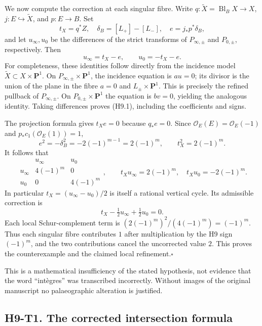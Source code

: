 \documentclass[11pt,a4paper]{article}
\begin{document}
We now compute the correction at each singular fibre. Write
$q:\widetilde X=\operatorname{Bl}_{B}X\to X$,
$j:E\hookrightarrow\widetilde X$, and $p:E\to B$. Set
\[
 t_X=q^*Z,\quad \delta_B=[L_+]-[L_-],\quad
 e=j_*p^*\delta_B,
\]
and let $u_\infty,u_0$ be the differences of the strict transforms of
$P_{\infty,\pm}$ and $P_{0,\pm}$, respectively. Then
\[
 u_\infty=t_X-e,\qquad u_0=-t_X-e.                 \tag{H9.1}
\]
For completeness, these identities follow directly from the incidence
model $\widetilde X\subset X\times\mathbf P^1$. On
$P_{\infty,\pm}\times\mathbf P^1$, the incidence equation is $a u=0$;
its divisor is the union of the plane in the fibre $a=0$ and
$L_\pm\times\mathbf P^1$. This is precisely the refined pullback of
$P_{\infty,\pm}$. On $P_{0,\pm}\times\mathbf P^1$ the equation is
$b v=0$, yielding the analogous identity. Taking differences proves
(H9.1), including the coefficients and signs.

The projection formula gives $t_X e=0$ because $q_*e=0$. Since
$\mathcal O_E(E)=\mathcal O_E(-1)$ and $p_*c_1(\mathcal O_E(1))=1$,
\[
 e^2=-\delta_B^2=-2(-1)^{m-1}=2(-1)^m,
 \qquad t_X^2=2(-1)^m.
\]
It follows that
\[
 \begin{array}{c|cc}
  &u_\infty&u_0\\\hline
 u_\infty&4(-1)^m&0\\
 u_0&0&4(-1)^m
 \end{array},\qquad
 t_Xu_\infty=2(-1)^m,\quad t_Xu_0=-2(-1)^m.
                                                        \tag{H9.2}
\]
In particular $t_X=(u_\infty-u_0)/2$ is itself a rational vertical cycle.
Its admissible correction is
\[
 t_X-\tfrac12u_\infty+\tfrac12u_0=0.
\]
Each local Schur-complement term is
$(2(-1)^m)^2/(4(-1)^m)=(-1)^m$. Thus each singular fibre contributes $1$
after multiplication by the H9 sign $(-1)^m$, and the two contributions
cancel the uncorrected value $2$. This proves the counterexample and the
claimed local refinement.\hfill$\square$

This is a mathematical insufficiency of the stated hypothesis, not evidence
that the word ``int\`egres'' was transcribed incorrectly. Without images of
the original manuscript no palaeographic alteration is justified.

\subsection*{H9-T1. The corrected intersection formula}
\end{document}
